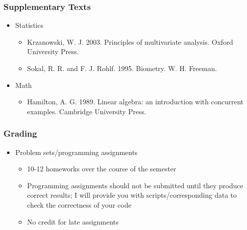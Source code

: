 \documentclass{beamer}
\begin{document}
\begin{frame}
  \frametitle{Supplementary Texts}
\begin{itemize}


\item Statistics
\begin{itemize}
	\item Krzanowski, W. J. 2003. Principles of multivariate analysis. Oxford University Press.
	\item Sokal, R. R. and F. J. Rohlf. 1995. Biometry. W. H. Freeman.
\end{itemize}

\item Math
\begin{itemize}
	\item Hamilton, A. G. 1989. Linear algebra: an introduction with concurrent examples. Cambridge University Press.
\end{itemize}

\end{itemize}

\end{frame}

\begin{frame}
  \frametitle{Grading}
\begin{itemize}
\item Problem sets/programming assignments
\begin{itemize}
	\item 10-12 homeworks over the course of the semester
	\item Programming assignments should not be submitted until they produce correct results; I will provide you with scripts/corresponding data to check the correctness of your code
	\item No credit for late assignments
\end{itemize}

\end{itemize}

\end{frame}
\end{document}
